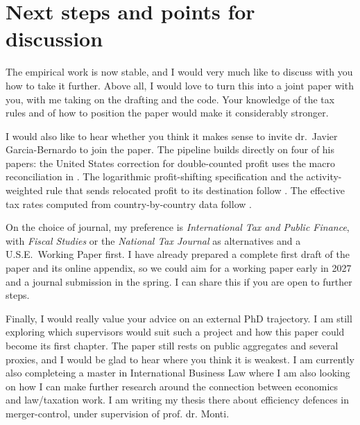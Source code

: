 \documentclass[11pt,a4paper]{article}
\begin{document}
\section{Next steps and points for discussion}

The empirical work is now stable, and I would very much like to discuss with you how to take it further. Above all, I would love to turn this into a joint paper with you, with me taking on the drafting and the code. Your knowledge of the tax rules and of how to position the paper would make it considerably stronger.

I would also like to hear whether you think it makes sense to invite dr.\ Javier Garcia-Bernardo to join the paper. The pipeline builds directly on four of his papers: the United States correction for double-counted profit uses the macro reconciliation in \citet{garcia-bernardo2022a}. The logarithmic profit-shifting specification and the activity-weighted rule that sends relocated profit to its destination follow \citet{garcia-bernardo2024}. The effective tax rates computed from country-by-country data follow \citet{garcia-bernardo2021,garcia-bernardo2023}. 

On the choice of journal, my preference is \emph{International Tax and Public Finance}, with \emph{Fiscal Studies} or the \emph{National Tax Journal} as alternatives and a U.S.E.\ Working Paper first. I have already prepared a complete first draft of the paper and its online appendix, so we could aim for a working paper early in 2027 and a journal submission in the spring. I can share this if you are open to further steps. 

Finally, I would really value your advice on an external PhD trajectory. I am still exploring which supervisors would suit such a project and how this paper could become its first chapter. The paper still rests on public aggregates and several proxies, and I would be glad to hear where you think it is weakest. I am currently also completeing a master in International Business Law where I am also looking on how I can make further research around the connection between economics and law/taxation work. I am writing my thesis there about efficiency defences in merger-control, under supervision of prof. dr. Monti. 
\end{document}

